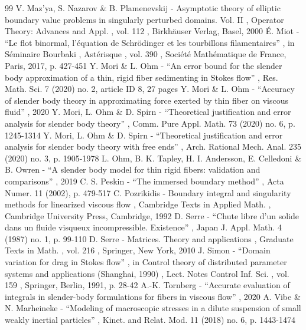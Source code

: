 \documentclass[10pt]{amsart}
\theoremstyle{definition}
\theoremstyle{remark}
\begin{document}
\begin{thebibliography}{99}
 V. Maz’ya, S. Nazarov \& B. Plamenevskij - Asymptotic theory of elliptic boundary value problems in singularly perturbed domains. Vol. II , Operator Theory: Advances and Appl. , vol. 112 , Birkhäuser Verlag, Basel, 2000
 É. Miot - “Le flot binormal, l’équation de Schrödinger et les tourbillons filamentaires” , in Séminaire Bourbaki , Astérisque , vol. 390 , Société Mathématique de France, Paris, 2017, p. 427-451
 Y. Mori \& L. Ohm - “An error bound for the slender body approximation of a thin, rigid fiber sedimenting in Stokes flow” , Res. Math. Sci. 7 (2020) no. 2, article ID 8, 27 pages
 Y. Mori \& L. Ohm - “Accuracy of slender body theory in approximating force exerted by thin fiber on viscous fluid” , 2020
 Y. Mori, L. Ohm \& D. Spirn - “Theoretical justification and error analysis for slender body theory” , Comm. Pure Appl. Math. 73 (2020) no. 6, p. 1245-1314
 Y. Mori, L. Ohm \& D. Spirn - “Theoretical justification and error analysis for slender body theory with free ends” , Arch. Rational Mech. Anal. 235 (2020) no. 3, p. 1905-1978
 L. Ohm, B. K. Tapley, H. I. Andersson, E. Celledoni \& B. Owren - “A slender body model for thin rigid fibers: validation and comparisons” , 2019
 C. S. Peskin - “The immersed boundary method” , Acta Numer. 11 (2002), p. 479-517
 C. Pozrikidis - Boundary integral and singularity methods for linearized viscous flow , Cambridge Texts in Applied Math. , Cambridge University Press, Cambridge, 1992
 D. Serre - “Chute libre d’un solide dans un fluide visqueux incompressible. Existence” , Japan J. Appl. Math. 4 (1987) no. 1, p. 99-110
 D. Serre - Matrices. Theory and applications , Graduate Texts in Math. , vol. 216 , Springer, New York, 2010
 J. Simon - “Domain variation for drag in Stokes flow” , in Control theory of distributed parameter systems and applications (Shanghai, 1990) , Lect. Notes Control Inf. Sci. , vol. 159 , Springer, Berlin, 1991, p. 28-42
 A.-K. Tornberg - “Accurate evaluation of integrals in slender-body formulations for fibers in viscous flow” , 2020
 A. Vibe \& N. Marheineke - “Modeling of macroscopic stresses in a dilute suspension of small weakly inertial particles” , Kinet. and Relat. Mod. 11 (2018) no. 6, p. 1443-1474
\end{thebibliography}
\end{document}
